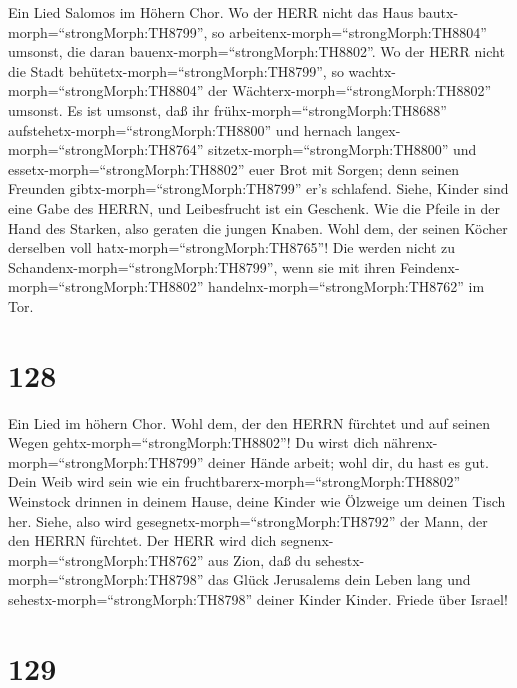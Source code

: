  Ein Lied Salomos im Höhern Chor. Wo der HERR nicht das Haus
bautx-morph=``strongMorph:TH8799'', so
arbeitenx-morph=``strongMorph:TH8804'' umsonst, die daran
bauenx-morph=``strongMorph:TH8802''. Wo der HERR nicht die Stadt
behütetx-morph=``strongMorph:TH8799'', so
wachtx-morph=``strongMorph:TH8804'' der
Wächterx-morph=``strongMorph:TH8802'' umsonst.  Es ist
umsonst, daß ihr frühx-morph=``strongMorph:TH8688''
aufstehetx-morph=``strongMorph:TH8800'' und hernach
langex-morph=``strongMorph:TH8764'' sitzetx-morph=``strongMorph:TH8800''
und essetx-morph=``strongMorph:TH8802'' euer Brot mit Sorgen; denn
seinen Freunden gibtx-morph=``strongMorph:TH8799'' er's schlafend.
 Siehe, Kinder sind eine Gabe des HERRN, und Leibesfrucht
ist ein Geschenk.  Wie die Pfeile in der Hand des Starken,
also geraten die jungen Knaben.  Wohl dem, der seinen Köcher
derselben voll hatx-morph=``strongMorph:TH8765''! Die werden nicht zu
Schandenx-morph=``strongMorph:TH8799'', wenn sie mit ihren
Feindenx-morph=``strongMorph:TH8802''
handelnx-morph=``strongMorph:TH8762'' im Tor.

\hypertarget{section-127}{%
\section{128}\label{section-127}}

 Ein Lied im höhern Chor. Wohl dem, der den HERRN fürchtet
und auf seinen Wegen gehtx-morph=``strongMorph:TH8802''!  Du
wirst dich nährenx-morph=``strongMorph:TH8799'' deiner Hände arbeit;
wohl dir, du hast es gut.  Dein Weib wird sein wie ein
fruchtbarerx-morph=``strongMorph:TH8802'' Weinstock drinnen in deinem
Hause, deine Kinder wie Ölzweige um deinen Tisch her. 
Siehe, also wird gesegnetx-morph=``strongMorph:TH8792'' der Mann, der
den HERRN fürchtet.  Der HERR wird dich
segnenx-morph=``strongMorph:TH8762'' aus Zion, daß du
sehestx-morph=``strongMorph:TH8798'' das Glück Jerusalems dein Leben
lang  und sehestx-morph=``strongMorph:TH8798'' deiner Kinder
Kinder. Friede über Israel!

\hypertarget{section-128}{%
\section{129}\label{section-128}}

